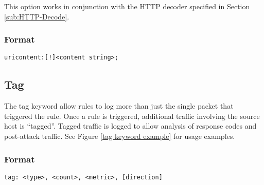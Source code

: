 \documentclass[english]{report}
\begin{document}
This option works in conjunction with the HTTP decoder specified in
Section \ref{sub:HTTP-Decode}.


\subsubsection{Format}

\begin{verbatim}
uricontent:[!]<content string>;
\end{verbatim}

\subsection{Tag \label{tag section}}

The tag keyword allow rules to log more than just the single packet
that triggered the rule. Once a rule is triggered, additional traffic
involving the source host is ``tagged''. Tagged traffic is logged
to allow analysis of response codes and post-attack traffic. See Figure
\ref{tag keyword example} for usage examples.


\subsubsection{Format}

\begin{verbatim}
tag: <type>, <count>, <metric>, [direction]
\end{verbatim}
\end{document}
